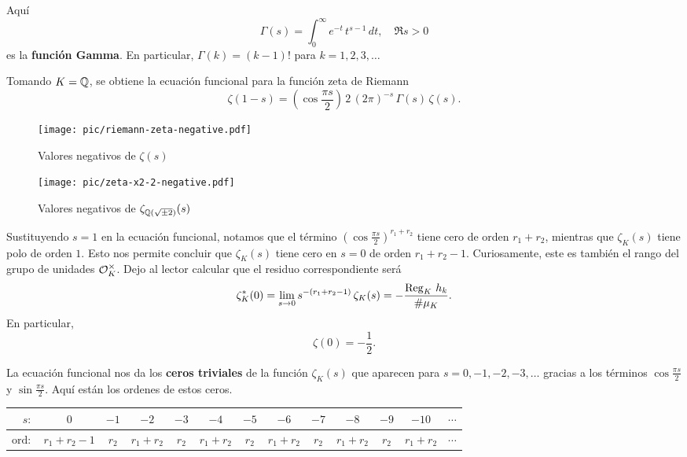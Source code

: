 Aquí
$$\Gamma (s) = \int_0^\infty e^{-t}\,t^{s-1}\,dt, \quad \Re s > 0$$
es la \textbf{función Gamma}. En particular, $\Gamma (k) = (k-1)!$ para $k = 1,2,3,\ldots$

Tomando $K = \mathbb{Q}$, se obtiene la ecuación funcional para la función zeta de
Riemann
\begin{equation}
  \label{eqn:ecuacion-funcional-para-zeta-de-Riemann}
  \zeta (1-s) = \left(\cos\frac{\pi s}{2}\right)\,2\,(2\pi)^{-s}\,\Gamma (s)\,\zeta (s).
\end{equation}

\begin{figure}
  \begin{center}
    \texttt{[image: pic/riemann-zeta-negative.pdf]}
  \end{center}

  \caption{Valores negativos de $\zeta (s)$}
\end{figure}

\begin{figure}
  \begin{center}
    \texttt{[image: pic/zeta-x2-2-negative.pdf]}
  \end{center}

  \caption{Valores negativos de $\zeta_{\mathbb{Q} (\sqrt{\pm 2})} (s)$}
\end{figure}

Sustituyendo $s = 1$ en la ecuación funcional, notamos que el término
$\left(\cos\frac{\pi s}{2}\right)^{r_1+r_2}$ tiene cero de orden $r_1 + r_2$,
mientras que $\zeta_K (s)$ tiene polo de orden $1$. Esto nos permite concluir
que $\zeta_K (s)$ tiene cero en $s = 0$ de orden $r_1 + r_2 - 1$. Curiosamente,
este es también el rango del grupo de unidades $\mathcal{O}_K^\times$. Dejo al lector
calcular que el residuo correspondiente será
$$\zeta_K^* (0) = \lim_{s \to 0} s^{-(r_1 + r_2 - 1)}\,\zeta_K (s) = -\frac{\operatorname{Reg}_K\,h_k}{\# \mu_K}.$$
En particular,
$$\zeta (0) = -\frac{1}{2}.$$

La ecuación funcional nos da los \textbf{ceros triviales} de la función
$\zeta_K (s)$ que aparecen para $s = 0,-1,-2,-3,\ldots$ gracias a los términos
$\cos \frac{\pi s}{2}$ y $\sin \frac{\pi s}{2}$. Aquí están los ordenes de estos
ceros.

\begin{center}
  \renewcommand{\arraystretch}{1.5}
  \begin{tabular}{rcccccccccccc}
    \hline
    $s\colon$ & $0$ & $-1$ & $-2$ & $-3$ & $-4$ & $-5$ & $-6$ & $-7$ & $-8$ & $-9$ & $-10$ & $\cdots$ \\
    \hline
    $\text{ord}\colon$ & $r_1 + r_2 - 1$ & $r_2$ & $r_1 + r_2$ & $r_2$ & $r_1 + r_2$ & $r_2$ & $r_1 + r_2$ & $r_2$ & $r_1 + r_2$ & $r_2$ & $r_1 + r_2$ & $\cdots$ \\
    \hline
  \end{tabular}
\end{center}

